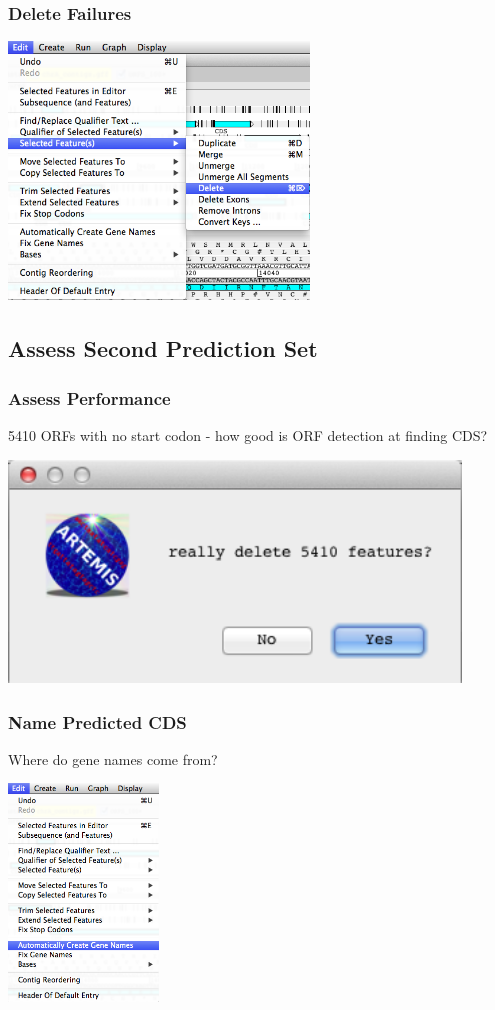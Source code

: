 \begin{frame}
  \frametitle{Delete Failures}    
  \begin{center}
    \includegraphics[width=0.6\textwidth]{images/artemis_orf10}     
  \end{center}
\end{frame}

\subsection{Assess Second Prediction Set}
\begin{frame}
  \frametitle{Assess Performance} 
  5410 ORFs with no start codon - how good is ORF detection at finding CDS?
  \begin{center}
    \includegraphics[width=0.9\textwidth]{images/artemis_orf11}     
  \end{center}
\end{frame}

\begin{frame}
  \frametitle{Name Predicted CDS}
  Where do gene names come from?
  \begin{center}
    \includegraphics[width=0.3\textwidth]{images/artemis_orf12}     
  \end{center}
\end{frame}

